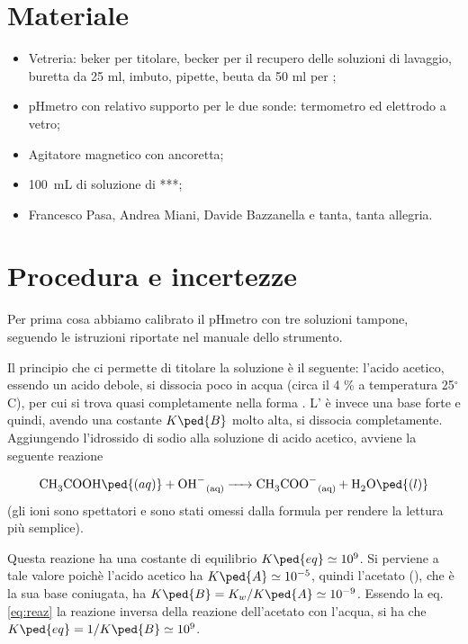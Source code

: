 \section*{Materiale}

\begin{itemize}
        \setlength{\parskip}{0pt}
        \item{Vetreria: beker per titolare, becker per il recupero delle soluzioni di lavaggio,
            buretta da 25 ml, imbuto, pipette, beuta da 50 ml per ;}
        \item{pHmetro con relativo supporto per le due sonde: termometro ed elettrodo a vetro;}
        \item{Agitatore magnetico con ancoretta;}
        \item{\SI{100}{\milli\liter} di soluzione di ***;}%
        \item{Francesco Pasa, Andrea Miani, Davide Bazzanella e tanta, tanta allegria.}
\end{itemize}

\section*{Procedura e incertezze}

Per prima cosa abbiamo calibrato il pHmetro con tre soluzioni tampone,
seguendo le istruzioni riportate nel manuale dello strumento.

Il principio che ci permette di titolare la soluzione è il seguente: l'acido acetico, essendo un acido debole,
si dissocia poco in acqua (circa il 4 \% a temperatura 25$^\circ$C),
per cui si trova quasi completamente nella forma .
L' è invece una base forte e quindi, avendo una costante $K\ped{B}$ molto alta,
si dissocia completamente. Aggiungendo l'idrossido di sodio alla soluzione di acido acetico,
avviene la seguente reazione

\begin{equation}
    \ce{CH3COOH\ped{(aq)} + OH- _{(aq)} -> CH3COO- _{(aq)} + H2O\ped{(l)}}
    \label{eq:reaz}
\end{equation}
%
(gli ioni  sono spettatori e sono stati omessi dalla formula per rendere la lettura più semplice).

Questa reazione ha una costante di equilibrio $K\ped{eq} \simeq 10^9$. Si perviene a tale valore poichè l'acido acetico ha $K\ped{A} \simeq 10^{-5}$,
quindi l'acetato (), che è la sua base coniugata, ha $K\ped{B} = K_w / K\ped{A} \simeq 10^{-9}$.
Essendo la eq. \eqref{eq:reaz} la reazione
inversa della reazione dell'acetato con l'acqua, si ha che $K\ped{eq} = 1/K\ped{B} \simeq 10^9$.

